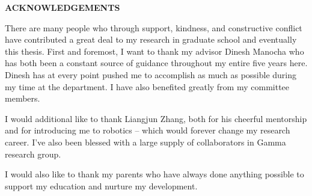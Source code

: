 \begin{center}
\vspace*{52pt}
{\Large \textbf{ACKNOWLEDGEMENTS}}
\end{center}

There are many people who through support, kindness, and constructive conflict have contributed a great deal to my research in graduate school and eventually this thesis.  First and foremost, I want to thank my advisor Dinesh Manocha who has both been a constant source of guidance throughout my entire five years here.  Dinesh has at every point pushed me to accomplish as much as possible during my time at the department. I have also benefited greatly from my committee members.


I would additional like to thank Liangjun Zhang, both for his cheerful mentorship and for introducing me to robotics -- which would forever change my research career.  I've also been blessed with a large supply of collaborators in Gamma research group.

I would also like to thank my parents who have always done anything possible to support my education and nurture my development.
